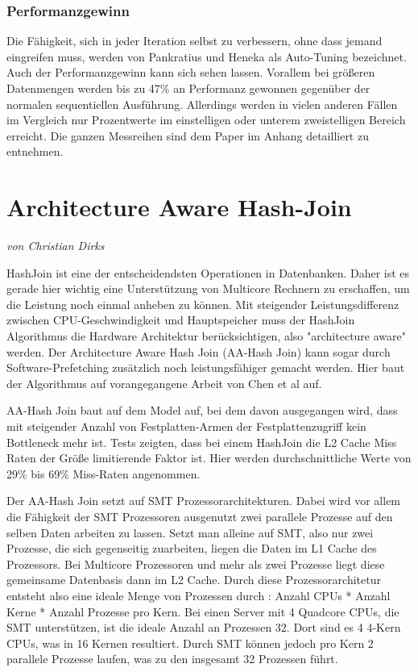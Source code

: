 \subsubsection*{Performanzgewinn}
Die Fähigkeit, sich in jeder Iteration selbst zu verbessern, ohne dass jemand eingreifen muss, werden von Pankratius und Heneka als Auto-Tuning bezeichnet. Auch der Performanzgewinn kann sich sehen lassen. Vorallem bei größeren Datenmengen werden bis zu 47\% an Performanz gewonnen gegenüber der normalen sequentiellen Ausführung. Allerdings werden in vielen anderen Fällen im Vergleich nur Prozentwerte im einstelligen oder unterem zweistelligen Bereich erreicht. Die ganzen Messreihen sind dem Paper im Anhang detailliert zu entnehmen.

\section{Architecture Aware Hash-Join}
\label{sec:AA-Hash-Join}
\textit{von Christian Dirks}

HashJoin ist eine der entscheidendsten Operationen in Datenbanken. Daher ist es gerade hier wichtig eine Unterstützung von Multicore Rechnern zu erschaffen, um die Leistung noch einmal anheben zu können. Mit steigender Leistungsdifferenz zwischen CPU-Geschwindigkeit und Hauptspeicher muss der HashJoin Algorithmus die Hardware Architektur berücksichtigen, also "architecture aware" werden. Der Architecture Aware Hash Join (AA-Hash Join) \cite{RASHID}\cite{GARCIA} kann sogar durch Software-Prefetching zusätzlich  noch leistungsfähiger gemacht werden. Hier baut der Algorithmus auf vorangegangene Arbeit von Chen et al \cite{CHEN} auf.

AA-Hash Join baut auf dem Model auf, bei dem davon ausgegangen wird, dass mit steigender Anzahl von Festplatten-Armen der Festplattenzugriff kein Bottleneck mehr ist. Tests zeigten, dass bei einem HashJoin die L2 Cache Miss Raten der Größe limitierende Faktor ist. Hier werden durchschnittliche Werte von 29\% bis 69\% Miss-Raten angenommen.

Der AA-Hash Join setzt auf SMT Prozessorarchitekturen. Dabei wird vor allem die Fähigkeit der SMT Prozessoren ausgenutzt zwei parallele Prozesse auf den selben Daten arbeiten zu lassen. Setzt man alleine auf SMT, also nur zwei Prozesse, die sich gegenseitig zuarbeiten, liegen die Daten im L1 Cache des Prozessors. Bei Multicore Prozessoren und mehr als zwei Prozesse liegt diese gemeinsame Datenbasis dann im L2 Cache. Durch diese Prozessorarchitetur entsteht also eine ideale Menge von Prozessen durch : Anzahl CPUs * Anzahl Kerne * Anzahl Prozesse pro Kern. Bei einen Server mit 4 Quadcore CPUs, die SMT unterstützen, ist die ideale Anzahl an Prozessen 32. Dort sind es 4 4-Kern CPUs, was in 16 Kernen resultiert. Durch SMT können jedoch pro Kern 2 parallele Prozesse laufen, was zu den insgesamt 32 Prozessen führt.

